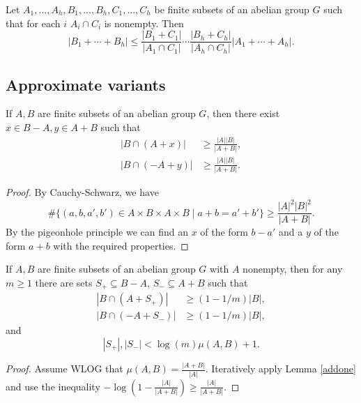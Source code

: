 \begin{prop}[Bourgain]\label{large-intersection} Let $A_1, ..., A_h, B_1, ..., B_h, C_1, ..., C_h$ be finite subsets of an abelian group $G$ such that for each $i$ $A_i\cap C_i$ is nonempty. Then
\[
|B_1 + \cdots + B_h| \le \frac{|B_1+C_1|}{|A_1\cap C_1|}\cdots\frac{|B_h+C_h|}{|A_h\cap C_h|}|A_1 + \cdots + A_h|.
\]
\end{prop}

\subsection{Approximate variants}

\begin{lem}\label{addone} If $A,B$ are finite subsets of an abelian group $G$, then there exist $x\in B-A, y\in A+B$ such that
\begin{align*}
|B\cap (A+x)| &\ge \frac{|A||B|}{|A+B|},\\
|B\cap (-A + y)| &\ge \frac{|A||B|}{|A+B|}.
\end{align*}
\end{lem}
\begin{proof} By Cauchy-Schwarz, we have
\[
\#\{(a,b,a',b')\in A\times B\times A\times B\mid a+b = a'+b'\} \ge \frac{|A|^2|B|^2}{|A+B|}.
\]
By the pigeonhole principle we can find an $x$ of the form $b-a'$ and a $y$ of the form $a+b$ with the required properties.
\end{proof}

\begin{thm}\label{approx-cover} If $A,B$ are finite subsets of an abelian group $G$ with $A$ nonempty, then for any $m \ge 1$ there are sets $S_+ \subseteq B-A$, $S_- \subseteq A+B$ such that
\begin{align*}
|B\cap (A+S_+)| &\ge (1-1/m)|B|,\\
|B\cap (-A+S_-)| &\ge (1-1/m)|B|,
\end{align*}
and
\[
|S_+|, |S_-| < \log(m)\mu(A,B)+1.
\]
\end{thm}
\begin{proof} Assume WLOG that $\mu(A,B) = \frac{|A+B|}{|A|}$. Iteratively apply Lemma \ref{addone} and use the inequality $-\log(1-\frac{|A|}{|A+B|}) \ge \frac{|A|}{|A+B|}$.
\end{proof}

